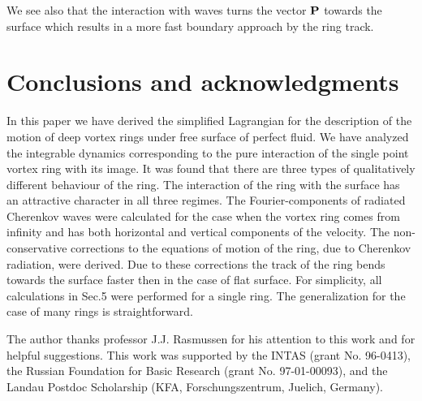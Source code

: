 We see also that the interaction with waves turns the vector ${\bf P}$ 
towards the surface which results in a more fast boundary approach 
by the ring track. 



\section{Conclusions and acknowledgments}

In this paper we have derived the simplified Lagrangian for the description
of the motion of deep vortex rings under free surface of perfect fluid. 
We have analyzed the integrable dynamics corresponding to the pure
interaction of the single point vortex ring with its image. It was found that
there are three types of qualitatively different behaviour of the ring. 
The interaction of the ring with the surface has an attractive
character in all three regimes.
The Fourier-components of radiated Cherenkov waves were calculated
for the case when the vortex ring comes from infinity and has both horizontal 
and vertical components of the velocity. The non-conservative corrections 
to the equations of motion of the ring, due to Cherenkov radiation, 
were derived. Due to these corrections the track of the ring bends towards
the surface faster then in the case of flat surface.
For simplicity, all calculations in Sec.5 were performed 
for a single ring. The generalization for the case of many 
rings is straightforward.



\medskip

The author thanks professor J.J. Rasmussen for his attention to this 
work and for helpful suggestions. 
This work was supported by the INTAS (grant No. 96-0413),
the Russian Foundation for Basic Research (grant No. 97-01-00093), 
and the Landau Postdoc Scholarship (KFA, Forschungszentrum, Juelich, Germany).



